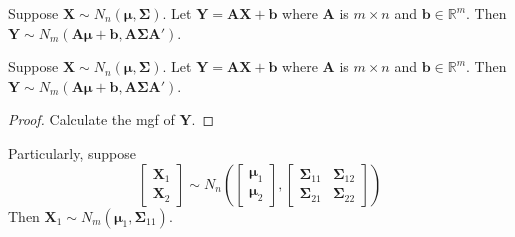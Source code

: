 \begin{theorem}[Linearity]
Suppose $\mathbf{X}\sim N_n(\boldsymbol{\mu},\boldsymbol{\Sigma})$. Let $\mathbf{Y}=\mathbf{A}\mathbf{X}+\mathbf{b}$ where $\mathbf{A}$ is $m\times n$ and $\mathbf{b}\in \mathbb{R}^{m}$. Then $\mathbf{Y}\sim N_m(\mathbf{A}\boldsymbol{\mu}+\mathbf{b},\mathbf{A}\boldsymbol{\Sigma}\mathbf{A}')$.
\end{theorem}
\begin{theorem}
Suppose $\mathbf{X}\sim N_n(\boldsymbol{\mu},\boldsymbol{\Sigma})$. Let $\mathbf{Y}=\mathbf{A}\mathbf{X}+\mathbf{b}$ where $\mathbf{A}$ is $m\times n$ and $\mathbf{b}\in \mathbb{R}^{m}$. Then $\mathbf{Y}\sim N_m(\mathbf{A}\boldsymbol{\mu}+\mathbf{b},\mathbf{A}\boldsymbol{\Sigma}\mathbf{A}')$.
\end{theorem}
\begin{proof}
Calculate the mgf of $\mathbf{Y}$.
\end{proof}

Particularly, suppose
\[
\begin{bmatrix}
\mathbf{X}_{1} \\
\mathbf{X}_{2} 
\end{bmatrix}\sim N_n(\begin{bmatrix}
\boldsymbol{\mu}_{1} \\
\boldsymbol{\mu}_{2}
\end{bmatrix},
\begin{bmatrix}
\boldsymbol{\Sigma}_{11}  & \boldsymbol{\Sigma}_{12} \\
\boldsymbol{\Sigma}_{21} & \boldsymbol{\Sigma}_{22}
\end{bmatrix})
\]
Then $\mathbf{X}_{1}\sim N_m(\boldsymbol{\mu}_{1},\boldsymbol{\Sigma}_{11})$.

